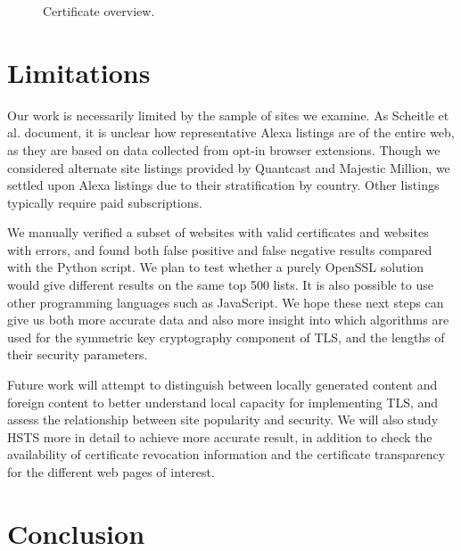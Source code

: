 \documentclass{easychair}
\begin{document}
\begin{figure}[!htb]
\begin{centering}
    \endminipage
    \caption{Certificate overview.}
	\label{fig:certificates}
    \end{centering}
\end{figure}


\section{Limitations}

Our work is necessarily limited by the sample of sites we examine. As 
Scheitle et al. \cite{internettoplists} document, it is unclear how 
representative Alexa listings are of the entire web, as they are based 
on data collected from opt-in browser extensions. Though we considered 
alternate site listings provided by Quantcast and Majestic Million, we 
settled upon Alexa listings due to their stratification by country. 
Other listings typically require paid subscriptions. 

We manually verified a subset of websites with valid certificates and 
websites with errors, and found both false positive and false negative 
results compared with the Python script. We plan to test whether a 
purely OpenSSL solution would give different results on the same top 500
lists. It is also possible to use other programming languages such as 
JavaScript. We hope these next steps can give us both more accurate data
and also more insight into which algorithms are used for the symmetric 
key cryptography component of TLS, and the lengths of their security 
parameters.

Future work will attempt to distinguish between locally generated 
content and foreign content to better understand local capacity for 
implementing TLS, and assess the relationship between site popularity 
and security. We will also study HSTS more in detail to achieve more 
accurate result, in addition to check the availability of certificate 
revocation information and the certificate transparency for the 
different web pages of interest.


\section{Conclusion}
\end{document}
